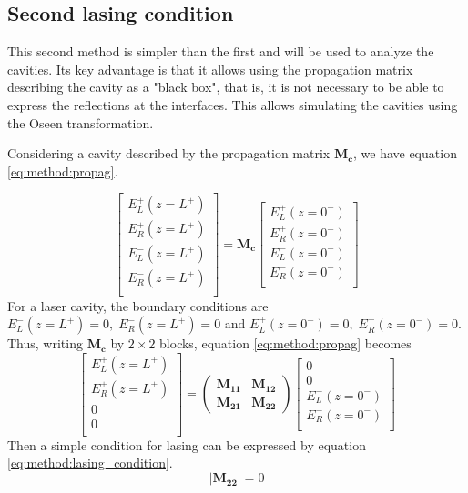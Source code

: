 \subsection{Second lasing condition}
\label{sec:lasing_condition}
This second method is simpler than the first and will be used to analyze the cavities. Its key advantage is that it allows using the propagation matrix describing the cavity as a "black box", that is, it is not necessary to be able to express the reflections at the interfaces. This allows simulating the cavities using the Oseen transformation.

Considering a cavity described by the propagation matrix $\bm{M_c}$, we have equation \ref{eq:method:propag}.

\begin{equation}
\begin{bmatrix}
E_{L}^+(z=L^+) \\
E_{R}^+(z=L^+) \\
E_{L}^-(z=L^+) \\
E_{R}^-(z=L^+) \\
\end{bmatrix} = \bm{M_c}\begin{bmatrix}
E_{L}^+(z=0^-) \\
E_{R}^+(z=0^-) \\
E_{L}^-(z=0^-) \\
E_{R}^-(z=0^-) \\
\end{bmatrix}\label{eq:method:propag}
\end{equation}
%
For a laser cavity, the boundary conditions are $E_{L}^-(z=L^+)=0,\;E_{R}^-(z=L^+)=0$ and $E_{L}^+(z=0^-)=0,\;E_{R}^+(z=0^-)=0$. Thus, writing $\bm{M_c}$ by $2\times2$ blocks, equation \ref{eq:method:propag} becomes
\begin{equation}
\begin{bmatrix}
E_{L}^+(z=L^+) \\
E_{R}^+(z=L^+) \\
0 \\
0 \\
\end{bmatrix} = \begin{pmatrix}
	\bm{M_{11}} & \bm{M_{12}}\\
	\bm{M_{21}} & \bm{M_{22}}
\end{pmatrix}\begin{bmatrix}
0 \\
0 \\
E_{L}^-(z=0^-) \\
E_{R}^-(z=0^-) \\
\end{bmatrix}
\end{equation}
%
Then a simple condition for lasing can be expressed by equation \ref{eq:method:lasing_condition}.
\begin{equation}
\left|\bm{M_{22}}\right| = 0 \label{eq:method:lasing_condition}
\end{equation}

